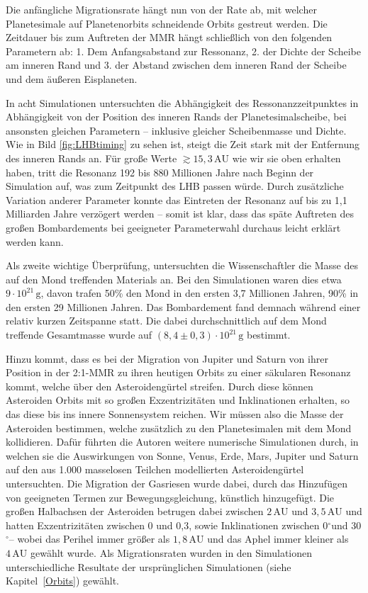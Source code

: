 \documentclass[12pt,a4paper,twoside]{article}
\newcommand{\refsec}[1]{siehe Kapitel~\ref{#1}}
\newcommand{\degree}{$^\circ$}
\newcommand{\AU}{\,\mathrm{AU}}
\begin{document}
Die anfängliche Migrationsrate hängt nun von der Rate ab, mit welcher Planetesimale auf Planetenorbits schneidende Orbits gestreut werden. Die Zeitdauer bis zum Auftreten der MMR hängt schließlich von den folgenden Parametern ab:
1. Dem Anfangsabstand zur Ressonanz, 2. der Dichte der Scheibe am inneren Rand und 3. der Abstand zwischen dem inneren Rand der Scheibe und dem äußeren Eisplaneten\cite{Gomes2005}.

In acht Simulationen untersuchten \cite{Gomes2005} die Abhängigkeit des Ressonanzzeitpunktes in Abhängigkeit von der Position des inneren Rands der Planetesimalscheibe, bei ansonsten gleichen Parametern – inklusive gleicher Scheibenmasse und Dichte. Wie in Bild \ref{fig:LHBtiming} zu sehen ist, steigt die Zeit stark mit der Entfernung des inneren Rands an. Für große Werte $\gtrsim 15,3 \AU$ wie wir sie oben erhalten haben, tritt die Resonanz 192 bis 880 Millionen Jahre nach Beginn der Simulation auf, was zum Zeitpunkt des LHB passen würde. %
Durch zusätzliche Variation anderer Parameter konnte das Eintreten der Resonanz auf bis zu 1,1 Milliarden Jahre\cite{Gomes2005} verzögert werden – somit ist klar, dass das späte Auftreten des großen Bombardements bei geeigneter Parameterwahl durchaus leicht erklärt werden kann.

Als zweite wichtige Überprüfung, untersuchten die Wissenschaftler die Masse des auf den Mond treffenden Materials an. Bei den Simulationen waren dies etwa $9 \cdot 10^{21} \, \mathrm{g}$, davon trafen 50\% den Mond in den ersten 3,7 Millionen Jahren, 90\% in den ersten 29 Millionen Jahren. Das Bombardement fand demnach während einer relativ kurzen Zeitspanne statt. Die dabei durchschnittlich auf dem Mond treffende Gesamtmasse wurde auf $\left(8,4 \pm 0,3\right) \cdot 10^{21} \, \mathrm{g}$ bestimmt\cite{Gomes2005}.

Hinzu kommt, dass es bei der Migration von Jupiter und Saturn von ihrer Position in der 2:1-MMR zu ihren heutigen Orbits zu einer säkularen Resonanz kommt, welche über den Asteroidengürtel streifen. %
Durch diese können Asteroiden Orbits mit so großen Exzentrizitäten und Inklinationen erhalten, so das diese bis ins innere Sonnensystem reichen. Wir müssen also die Masse der Asteroiden bestimmen, welche zusätzlich zu den Planetesimalen %
mit dem Mond kollidieren.
Dafür führten die Autoren weitere numerische Simulationen durch, in welchen sie die Auswirkungen von Sonne, Venus, Erde, Mars, Jupiter und Saturn auf den aus 1.000 masselosen Teilchen modellierten Asteroidengürtel untersuchten.
Die Migration der Gasriesen wurde dabei, durch das Hinzufügen von geeigneten Termen zur Bewegungsgleichung, künstlich hinzugefügt. %
Die großen Halbachsen der Asteroiden betrugen dabei zwischen $2 \AU$ und $3,5 \AU$ und hatten Exzentrizitäten zwischen 0 und 0,3, sowie Inklinationen zwischen 0\degree und 30\degree – wobei das Perihel immer größer als $1,8 \AU$ und das Aphel immer kleiner als $4 \AU$ gewählt wurde. %
Als Migrationsraten wurden in den Simulationen unterschiedliche Resultate der ursprünglichen Simulationen (\refsec{Orbits}) gewählt. %
\end{document}
